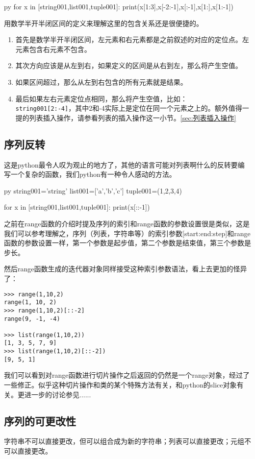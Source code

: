 \documentclass[12pt,oneside]{book}
\begin{document}
\begin{common-format}
\begin{xverbatim}[129]{py}
for x in [string001,list001,tuple001]:
    print(x[1:3],x[-2:-1],x[:-1],x[1:],x[1:-1])
\end{xverbatim}
用数学半开半闭区间的定义来理解这里的包含关系还是很便捷的。
\begin{enumerate}
\item 首先是数学半开半闭区间，左元素和右元素都是之前叙述的对应的定位点。左元素包含右元素不包含。
\item 其次方向应该是从左到右，如果定义的区间是从右到左，那么将产生空值。
\item 如果区间超过，那么从左到右包含的所有元素就是结果。
\item 最后如果左右元素定位点相同，那么将产生空值，比如：\\
\verb+string001[2:-4]+，其中2和-4实际上是定位在同一个元素之上的。额外值得一提的列表插入操作，请参看列表的插入操作这一小节。\ref{sec:列表插入操作}
\end{enumerate}


\subsection{序列反转}
这是python最令人叹为观止的地方了，其他的语言可能对列表啊什么的反转要编写一个复杂的函数，我们python有一种令人感动的方法。

\begin{xverbatim}[129]{py}
string001='string'
list001=['a','b','c']
tuple001=(1,2,3,4)

for x in [string001,list001,tuple001]:
    print(x[::-1])
\end{xverbatim}

之前在range函数的介绍时提及序列的索引和range函数的参数设置很是类似，这是我们可以参考理解之，序列（列表，字符串等）的索引参数[start:end:step]和range函数的参数设置一样，第一个参数是起步值，第二个参数是结束值，第三个参数是步长。

然后range函数生成的迭代器对象同样接受这种索引参数语法，看上去更加的怪异了：
\begin{Verbatim}
>>> range(1,10,2)
range(1, 10, 2)
>>> range(1,10,2)[::-2]
range(9, -1, -4)

>>> list(range(1,10,2))
[1, 3, 5, 7, 9]
>>> list(range(1,10,2)[::-2])
[9, 5, 1]
\end{Verbatim}
我们可以看到对range函数进行切片操作之后返回的仍然是一个range对象，经过了一些修正。似乎这种切片操作和类的某个特殊方法有关，和python的slice对象有关。更进一步的讨论参见......



\subsection{序列的可更改性}
字符串不可以直接更改，但可以组合成为新的字符串；列表可以直接更改；元组不可以直接更改。




\end{common-format}
\end{document}

